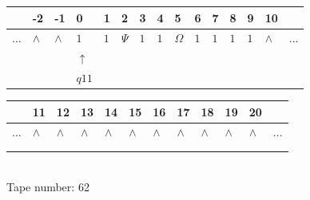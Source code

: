 \documentclass[11pt]{article}
\begin{document}
\begin{table}[H]
\centering
\begin{tabular}{lllllllllllllll}
 & -2 & -1 & 0 & 1 & 2 & 3 & 4 & 5 & 6 & 7 & 8 & 9 & 10 & \\
\hline
$...$ & \multicolumn{1}{|l|}{$\wedge$} & \multicolumn{1}{|l|}{$\wedge$} & \multicolumn{1}{|l|}{$1$} & \multicolumn{1}{|l|}{$1$} & \multicolumn{1}{|l|}{$\Psi$} & \multicolumn{1}{|l|}{$1$} & \multicolumn{1}{|l|}{$1$} & \multicolumn{1}{|l|}{$\Omega$} & \multicolumn{1}{|l|}{$1$} & \multicolumn{1}{|l|}{$1$} & \multicolumn{1}{|l|}{$1$} & \multicolumn{1}{|l|}{$1$} & \multicolumn{1}{|l|}{$\wedge$} & $...$\\
\hline
&  &  & $\uparrow$ &  &  &  &  &  &  &  &  &  &  &  \\
&  &  & $ q11 $ &  &  &  &  &  &  &  &  &  &  &  \\
\end{tabular}
\begin{tabular}{llllllllllll}
 & 11 & 12 & 13 & 14 & 15 & 16 & 17 & 18 & 19 & 20 & \\
\hline
$...$ & \multicolumn{1}{|l|}{$\wedge$} & \multicolumn{1}{|l|}{$\wedge$} & \multicolumn{1}{|l|}{$\wedge$} & \multicolumn{1}{|l|}{$\wedge$} & \multicolumn{1}{|l|}{$\wedge$} & \multicolumn{1}{|l|}{$\wedge$} & \multicolumn{1}{|l|}{$\wedge$} & \multicolumn{1}{|l|}{$\wedge$} & \multicolumn{1}{|l|}{$\wedge$} & \multicolumn{1}{|l|}{$\wedge$} & $...$\\
\hline
&  &  &  &  &  &  &  &  &  &  &  \\
&  &  &  &  &  &  &  &  &  &  &  \\
\end{tabular}
\\
Tape number: 62
\noindent\makebox[\linewidth]{\hdashrule{\textwidth}{1pt}{1pt}}\end{table}
\end{document}
